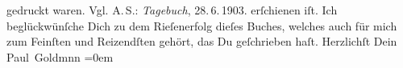 \begin{ledgroupsized}[t]{13cm}
{{{                  gedruckt waren. Vgl. A. S.: \emph{Tagebuch}, 28. 6. 1903.}}}\label{K_L03376-1h} erſchienen iſt. Ich beglückwünſche Dich zu dem Rieſenerfolg dieſes Buches, welches auch für mich
               zum Feinſten und Reizendſten gehört, das Du geſchrieben haſt.\pend
           \pstart
           Herzlichſt Dein {\\[\baselineskip]}\spacefill\mbox{Paul Goldmnn}\pend
           \leftskip=0em{}
         
         \endnumbering{}\end{ledgroupsized}  \newcommand{\dateiname}{L03376}\newcommand{\titel}{Paul Goldmann an Arthur Schnitzler, 29. 6. 1903}\newcommand{\editorInnen}{Martin Anton Müller und Laura Untner}
      